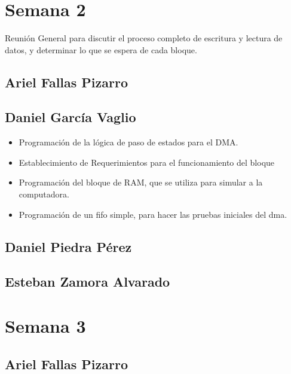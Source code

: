 \newpage
\section{Semana 2}

Reunión General para discutir el proceso completo de escritura y lectura de datos, y determinar lo
que se espera de cada bloque. 
\subsection{Ariel Fallas Pizarro}


\subsection{Daniel García Vaglio}
\begin{itemize}
\item Programación de la lógica de paso de estados para el DMA.
\item Establecimiento de Requerimientos para el funcionamiento del bloque
\item Programación del bloque de RAM, que se utiliza para simular a la computadora. 
\item Programación de un fifo simple, para hacer las pruebas iniciales del dma.
\end{itemize}


\subsection{Daniel Piedra Pérez}


\subsection{Esteban Zamora Alvarado}

\newpage
\section{Semana 3}
\subsection{Ariel Fallas Pizarro}



